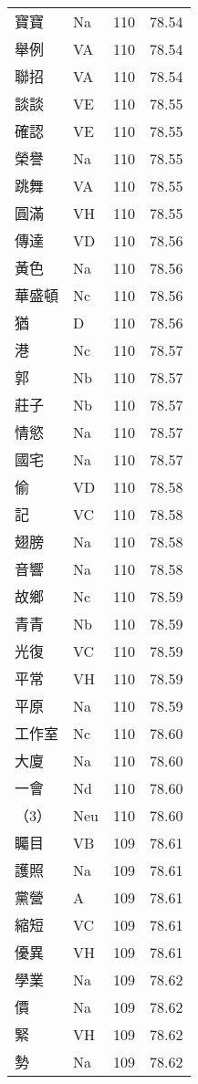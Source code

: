 \documentclass[twocolumn]{book}
\begin{document}
\begin{supertabular}{llrr}
寶寶 & Na & 110 &  78.54\\
舉例 & VA & 110 &  78.54\\
聯招 & VA & 110 &  78.54\\
談談 & VE & 110 &  78.55\\
確認 & VE & 110 &  78.55\\
榮譽 & Na & 110 &  78.55\\
跳舞 & VA & 110 &  78.55\\
圓滿 & VH & 110 &  78.55\\
傳達 & VD & 110 &  78.56\\
黃色 & Na & 110 &  78.56\\
華盛頓 & Nc & 110 &  78.56\\
猶 & D & 110 &  78.56\\
港 & Nc & 110 &  78.57\\
郭 & Nb & 110 &  78.57\\
莊子 & Nb & 110 &  78.57\\
情慾 & Na & 110 &  78.57\\
國宅 & Na & 110 &  78.57\\
偷 & VD & 110 &  78.58\\
記 & VC & 110 &  78.58\\
翅膀 & Na & 110 &  78.58\\
音響 & Na & 110 &  78.58\\
故鄉 & Nc & 110 &  78.59\\
青青 & Nb & 110 &  78.59\\
光復 & VC & 110 &  78.59\\
平常 & VH & 110 &  78.59\\
平原 & Na & 110 &  78.59\\
工作室 & Nc & 110 &  78.60\\
大廈 & Na & 110 &  78.60\\
一會 & Nd & 110 &  78.60\\
（3） & Neu & 110 &  78.60\\
矚目 & VB & 109 &  78.61\\
護照 & Na & 109 &  78.61\\
黨營 & A & 109 &  78.61\\
縮短 & VC & 109 &  78.61\\
優異 & VH & 109 &  78.61\\
學業 & Na & 109 &  78.62\\
價 & Na & 109 &  78.62\\
緊 & VH & 109 &  78.62\\
勢 & Na & 109 &  78.62\\

\end{supertabular}
\end{document}
